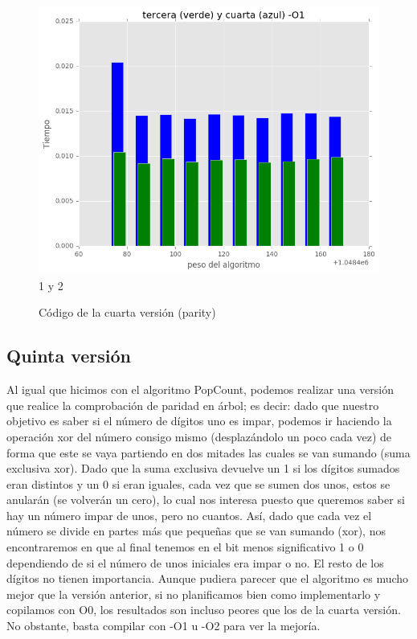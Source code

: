 \documentclass[a4paper, 11pt]{article}
\begin{document}
\begin{figure}[!hbp]
	\includegraphics[scale=0.6]{3y4p_2.png}
	\caption{1 y 2	\label{3y4p_2}}
\end{figure}
\begin{figure}[!hbp]
	
	\caption{Código de la cuarta versión (parity)	\label{parity cuarta versión}}
\end{figure}
\pagebreak
\subsection{Quinta versión}
Al igual que hicimos con el algoritmo PopCount, podemos realizar una versión que realice la comprobación de paridad en árbol; es decir: dado que nuestro objetivo es saber si el número de dígitos uno es impar, podemos ir haciendo la operación xor del número consigo mismo (desplazándolo un poco cada vez) de forma que este se vaya partiendo en dos mitades las cuales se van sumando (suma exclusiva xor). Dado que la suma exclusiva devuelve un 1 si los dígitos sumados eran distintos y un 0 si eran iguales, cada vez que se sumen dos unos, estos se anularán (se volverán un cero), lo cual nos interesa puesto que queremos saber si hay un número impar de unos, pero no cuantos. Así, dado que cada vez el número se divide en partes más que pequeñas que se van sumando (xor), nos encontraremos en que al final tenemos en el bit menos significativo 1 o 0 dependiendo de si el número de unos iniciales era impar o no. El resto de los dígitos no tienen importancia. 
Aunque pudiera parecer que el algoritmo es mucho mejor que la versión anterior, si no planificamos bien como implementarlo y copilamos con O0, los resultados son incluso peores que los de la cuarta versión. No obstante, basta compilar con -O1 u -O2 para ver la mejoría.
\end{document}
